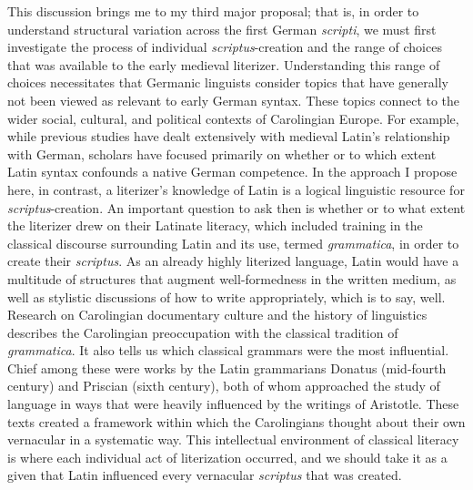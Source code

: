 This discussion brings me to my third major proposal; that is, in order to understand structural variation across the first German \textit{scripti}, we must first investigate the process of individual \textit{scriptus}{}-creation and the range of choices that was available to the early medieval literizer. Understanding this range of choices necessitates that Germanic linguists consider topics that have generally not been viewed as relevant to early German syntax. These topics connect to the wider social, cultural, and political contexts of Carolingian Europe. For example, while previous studies have dealt extensively with medieval Latin’s relationship with German, scholars have focused primarily on whether or to which extent Latin syntax confounds a native German competence. In the approach I propose here, in contrast, a literizer’s knowledge of Latin is a logical linguistic resource for \textit{scriptus}{}-creation. An important question to ask then is whether or to what extent the literizer drew on their Latinate literacy, which included training in the classical discourse surrounding Latin and its use, termed \textit{grammatica}, in order to create their \textit{scriptus}. As an already highly literized language, Latin would have a multitude of structures that augment well-formedness in the written medium, as well as stylistic discussions of how to write appropriately, which is to say, well. Research on Carolingian documentary culture and the history of linguistics describes the Carolingian preoccupation with the classical tradition of \textit{grammatica}. It also tells us which classical grammars were the most influential. Chief among these were works by the Latin grammarians Donatus (mid-fourth century) and Priscian (sixth century), both of whom approached the study of language in ways that were heavily influenced by the writings of Aristotle. These texts created a framework within which the Carolingians thought about their own vernacular in a systematic way. This intellectual environment of classical literacy is where each individual act of literization occurred, and we should take it as a given that Latin influenced every vernacular \textit{scriptus} that was created. 

